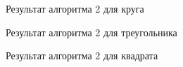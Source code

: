 \documentclass[a4paper]{article}
\begin{document}
\begin{figure}[h!]
  \caption{Результат алгоритма 2 для круга}
  \label{s1}
\end{figure}
\begin{figure}[h!]
  \caption{Результат алгоритма 2 для треугольника}
  \label{s2}
\end{figure}
\begin{figure}[h!]
  \caption{Результат алгоритма 2 для квадрата}
  \label{s3}
\end{figure}
\end{document}
